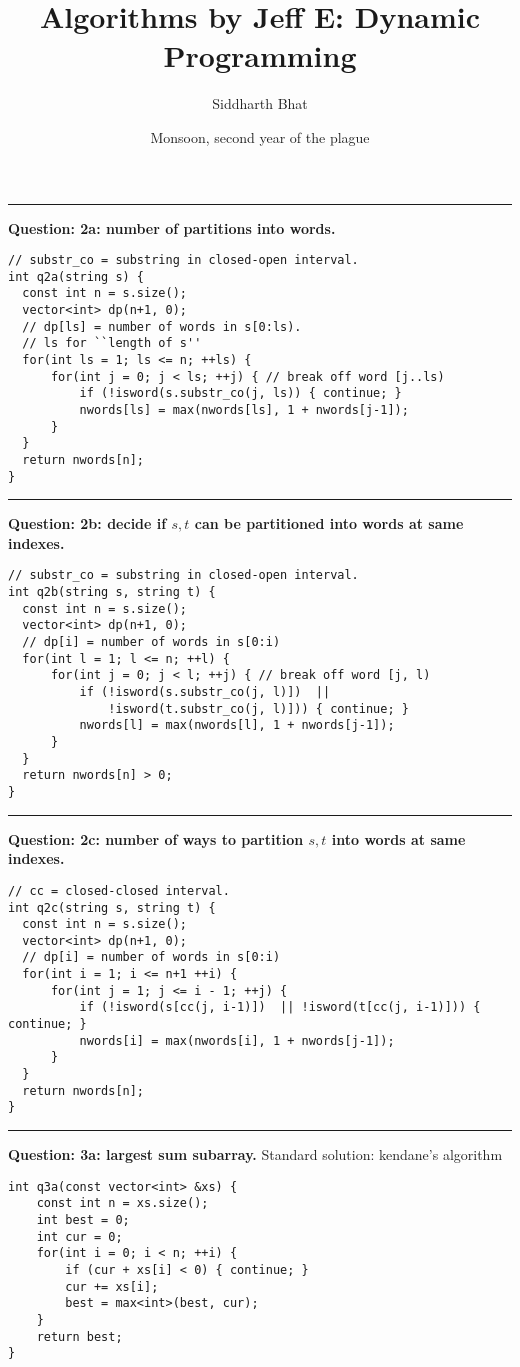 \documentclass[14pt]{report}
\title{Algorithms by Jeff E: Dynamic Programming}
\author{Siddharth Bhat}
\date{Monsoon, second year of the plague}
\newcommand*{\question}[1]{\leavevmode\clearpage \par\noindent\rule{\textwidth}{0.4pt} \textbf{Question: #1.}}
\begin{document}
\maketitle
\question{2a: number of partitions into words}

\begin{verbatim}
// substr_co = substring in closed-open interval.
int q2a(string s) {
  const int n = s.size();
  vector<int> dp(n+1, 0);
  // dp[ls] = number of words in s[0:ls).
  // ls for ``length of s''
  for(int ls = 1; ls <= n; ++ls) {
      for(int j = 0; j < ls; ++j) { // break off word [j..ls)
          if (!isword(s.substr_co(j, ls)) { continue; }
          nwords[ls] = max(nwords[ls], 1 + nwords[j-1]);
      }
  }
  return nwords[n];
}
\end{verbatim}

\question{2b: decide if  $s, t$ can be partitioned into words at same indexes}

\begin{verbatim}
// substr_co = substring in closed-open interval.
int q2b(string s, string t) {
  const int n = s.size();
  vector<int> dp(n+1, 0);
  // dp[i] = number of words in s[0:i)
  for(int l = 1; l <= n; ++l) {
      for(int j = 0; j < l; ++j) { // break off word [j, l)
          if (!isword(s.substr_co(j, l)])  ||
              !isword(t.substr_co(j, l)])) { continue; }
          nwords[l] = max(nwords[l], 1 + nwords[j-1]);
      }
  }
  return nwords[n] > 0;
}
\end{verbatim}


\question{2c: number of ways to  partition $s, t$ into words at same indexes}

\begin{verbatim}
// cc = closed-closed interval.
int q2c(string s, string t) {
  const int n = s.size();
  vector<int> dp(n+1, 0);
  // dp[i] = number of words in s[0:i)
  for(int i = 1; i <= n+1 ++i) {
      for(int j = 1; j <= i - 1; ++j) {
          if (!isword(s[cc(j, i-1)])  || !isword(t[cc(j, i-1)])) { continue; }
          nwords[i] = max(nwords[i], 1 + nwords[j-1]);
      }
  }
  return nwords[n];
}
\end{verbatim}

\question{3a: largest sum subarray} Standard solution: kendane's algorithm

\begin{verbatim}
int q3a(const vector<int> &xs) {
    const int n = xs.size();
    int best = 0;
    int cur = 0;
    for(int i = 0; i < n; ++i) {
        if (cur + xs[i] < 0) { continue; }
        cur += xs[i];
        best = max<int>(best, cur);
    }
    return best;
}
\end{verbatim}
\end{document}
